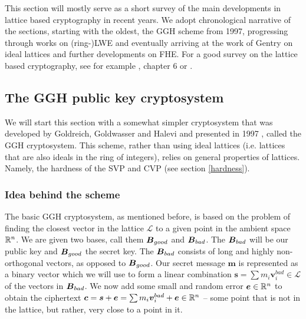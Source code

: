 
This section will mostly serve as a short survey of the main developments in lattice based cryptography in recent years. We adopt chronological narrative of the sections, starting with the oldest, the GGH scheme from 1997, progressing through works on (ring-)LWE and eventually arriving at the work of Gentry \cite{gentry_phd} on ideal lattices and further developments on FHE. For a good survey on the lattice based cryptography, see for example \cite{two_faces}, \cite{book} chapter 6 or \cite{lattice-survey}.

\subsection{The GGH public key cryptosystem}
We will start this section with a somewhat simpler cryptosystem that was developed by Goldreich, Goldwasser and Halevi and presented in 1997 \cite{ggh}, called the GGH cryptosystem. This scheme, rather than using ideal lattices (i.e. lattices that are also ideals in the ring of integers), relies on general properties of lattices. Namely, the hardness of the SVP and CVP (see section \ref{hardness}).

\subsubsection*{Idea behind the scheme}
The basic GGH cryptosystem, as mentioned before, is based on the problem of finding the closest vector in the lattice $\mathcal{L}$ to a given point in the ambient space $\mathbb{R}^n$. We are given two bases, call them $\boldsymbol{B}_{good}$ and $\boldsymbol{B}_{bad}$. The $\boldsymbol{B}_{bad}$ will be our public key and $\boldsymbol{B}_{good}$ the secret key. The $\boldsymbol{B}_{bad}$ consists of long and highly non-orthogonal vectors, as opposed to $\boldsymbol{B}_{good}$. Our secret message $\bm{m}$ is represented as a binary vector which we will use to form a linear combination $\bm{s} = \sum m_i \bm{v}_i^{bad} \in \mathcal{L}$ of the vectors in $\boldsymbol{B}_{bad}$. We now add some small and random error $\boldsymbol{e} \in \mathbb{R}^n$ to obtain the ciphertext $\boldsymbol{c} = \boldsymbol{s} + \boldsymbol{e} = \sum m_i \boldsymbol{v}_i^{bad} + \boldsymbol{e} \in \mathbb{R}^n$ -- some point that is not in the lattice, but rather, very close to a point in it.

